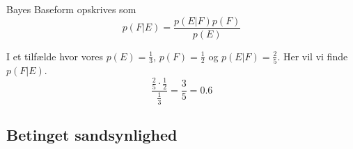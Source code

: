 Bayes Baseform opskrives som 
\begin{equation}
	p(F|E)=\frac{p(E|F)p(F)}{p(E)}
\end{equation}

I et tilfælde hvor vores $p(E)= \frac{1}{3}$, $p(F)=\frac{1}{2}$ og $p(E|F)=\frac{2}{5}$.
Her vil vi finde $p(F|E)$.
\begin{equation}
	\frac{\frac{2}{5}\cdot\frac{1}{2}}{\frac{1}{3}}=\frac{3}{5}=0.6
\end{equation}


\subsection{Betinget sandsynlighed}
